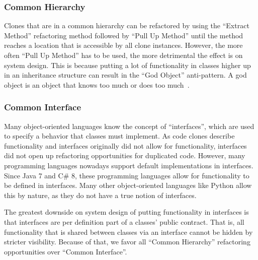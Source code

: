 \documentclass[runningheads]{llncs}
\begin{document}
\subsubsection{Common Hierarchy}
Clones that are in a common hierarchy can be refactored by using the ``Extract Method'' refactoring method followed by ``Pull Up Method'' until the method reaches a location that is accessible by all clone instances. However, the more often ``Pull Up Method'' has to be used, the more detrimental the effect is on system design. This is because putting a lot of functionality in classes higher up in an inheritance structure can result in the ``God Object'' anti-pattern. A god object is an object that knows too much or does too much~\cite{fowler2018refactoring}.



\subsubsection{Common Interface}
Many object-oriented languages know the concept of ``interfaces'', which are used to specify a behavior that classes must implement. As code clones describe functionality and interfaces originally did not allow for functionality, interfaces did not open up refactoring opportunities for duplicated code. However, many programming languages nowadays support default implementations in interfaces. Since Java 7 and C\# 8, these programming languages allow for functionality to be defined in interfaces. Many other object-oriented languages like Python allow this by nature, as they do not have a true notion of interfaces.

The greatest downside on system design of putting functionality in interfaces is that interfaces are per definition part of a classes' public contract. That is, all functionality that is shared between classes via an interface cannot be hidden by stricter visibility. Because of that, we favor all ``Common Hierarchy'' refactoring opportunities over ``Common Interface''.
\end{document}

